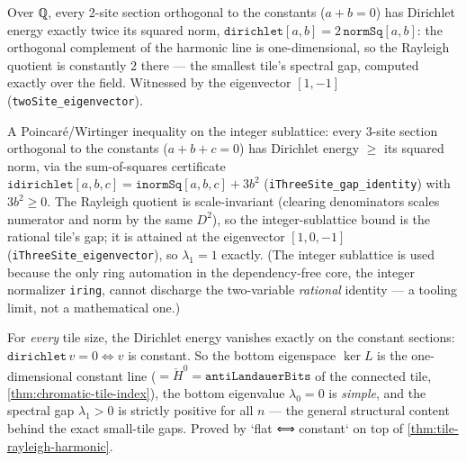 \begin{theorem}[The 2-site tile gap is exactly $\lambda_1=2$]\label{thm:two-site-gap}\leanok{}
Over ℚ, every 2-site section orthogonal to the constants ($a+b=0$) has Dirichlet energy exactly twice
its squared norm, $\texttt{dirichlet}[a,b]=2\,\texttt{normSq}[a,b]$: the orthogonal complement of the
harmonic line is one-dimensional, so the Rayleigh quotient is constantly $2$ there --- the smallest
tile's spectral gap, computed exactly over the field. Witnessed by the eigenvector $[1,-1]$
(\texttt{twoSite\_eigenvector}).
\end{theorem}

\begin{theorem}[The 3-site spectral gap is exactly $\lambda_1=1$]\label{thm:three-site-gap-lower}\leanok{}
A Poincaré/Wirtinger inequality on the integer sublattice: every 3-site section orthogonal to the
constants ($a+b+c=0$) has Dirichlet energy $\ge$ its squared norm, via the sum-of-squares certificate
$\texttt{idirichlet}[a,b,c]=\texttt{inormSq}[a,b,c]+3b^2$ (\texttt{iThreeSite\_gap\_identity}) with
$3b^2\ge 0$. The Rayleigh quotient is scale-invariant (clearing denominators scales numerator and norm
by the same $D^2$), so the integer-sublattice bound is the rational tile's gap; it is attained at the
eigenvector $[1,0,-1]$ (\texttt{iThreeSite\_eigenvector}), so $\lambda_1=1$ exactly. (The integer
sublattice is used because the only ring automation in the dependency-free core, the integer normalizer
\texttt{iring}, cannot discharge the two-variable \emph{rational} identity --- a tooling limit, not a
mathematical one.)
\end{theorem}

\begin{theorem}\label{thm:tile-harmonic-kernel-constants}\leanok{}
For \emph{every} tile size, the Dirichlet energy vanishes exactly on the constant sections:
$\texttt{dirichlet}\,v=0\iff v$ is constant. So the bottom eigenspace $\ker L$ is the one-dimensional
constant line ($=\check H^0=\texttt{antiLandauerBits}$ of the connected tile,
\cref{thm:chromatic-tile-index}), the bottom eigenvalue $\lambda_0=0$ is \emph{simple}, and the
spectral gap $\lambda_1>0$ is strictly positive for all $n$ --- the general structural content behind
the exact small-tile gaps. Proved by `flat ⟺ constant` on top of \cref{thm:tile-rayleigh-harmonic}.
\end{theorem}
